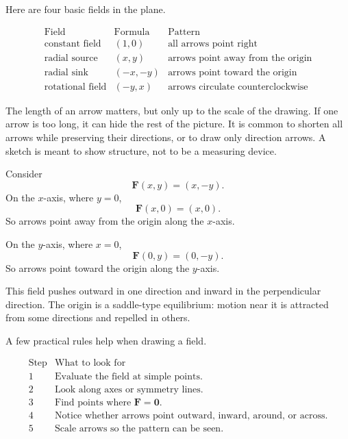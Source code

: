 Here are four basic fields in the plane.

\[
\begin{array}{c|c|c}
\text{Field} & \text{Formula} & \text{Pattern} \\ \hline
\text{constant field} & (1,0) & \text{all arrows point right}\\[1mm]
\text{radial source} & (x,y) & \text{arrows point away from the origin}\\[1mm]
\text{radial sink} & (-x,-y) & \text{arrows point toward the origin}\\[1mm]
\text{rotational field} & (-y,x) & \text{arrows circulate counterclockwise}
\end{array}
\]

The length of an arrow matters, but only up to the scale of the drawing.  If one arrow
is too long, it can hide the rest of the picture.  It is common to shorten all arrows
while preserving their directions, or to draw only direction arrows.  A sketch is meant
to show structure, not to be a measuring device.

\begin{example}
Consider
\[
    \mathbf F(x,y)=(x,-y).
\]
On the \(x\)-axis, where \(y=0\),
\[
    \mathbf F(x,0)=(x,0).
\]
So arrows point away from the origin along the \(x\)-axis.

On the \(y\)-axis, where \(x=0\),
\[
    \mathbf F(0,y)=(0,-y).
\]
So arrows point toward the origin along the \(y\)-axis.

This field pushes outward in one direction and inward in the perpendicular direction.
The origin is a saddle-type equilibrium: motion near it is attracted from some
directions and repelled in others.
\end{example}

A few practical rules help when drawing a field.

\[
\begin{array}{c|l}
\text{Step} & \text{What to look for} \\ \hline
1 & \text{Evaluate the field at simple points.}\\
2 & \text{Look along axes or symmetry lines.}\\
3 & \text{Find points where }\mathbf F=\mathbf 0.\\
4 & \text{Notice whether arrows point outward, inward, around, or across.}\\
5 & \text{Scale arrows so the pattern can be seen.}
\end{array}
\]

